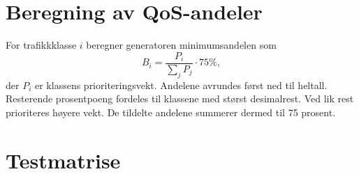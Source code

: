 \label{sec:vedlegg}
\appendix

\section{Beregning av QoS-andeler}
\label{sec:vedlegg-qos}
For trafikkklasse $i$ beregner generatoren minimumsandelen som
\[
 B_i=\frac{P_i}{\sum_j P_j}\cdot75\%,
\]
der $P_i$ er klassens prioriteringsvekt. Andelene avrundes først ned til heltall. Resterende prosentpoeng fordeles til klassene med størst desimalrest. Ved lik rest prioriteres høyere vekt. De tildelte andelene summerer dermed til 75 prosent.

\section{Testmatrise}
\label{sec:vedlegg-testmatrise}
\begingroup
\scriptsize
{}
\setlength{\tabcolsep}{2pt}
